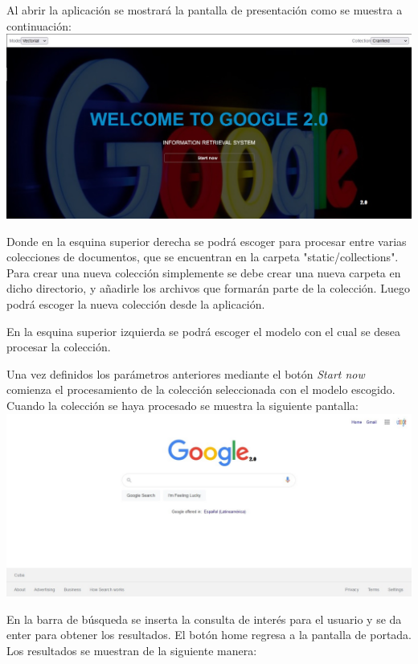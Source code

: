 \documentclass[twoside]{article}
\begin{document}
Al abrir la aplicaci\'on se mostrar\'a la pantalla de presentaci\'on como se muestra a continuaci\'on:\\

\includegraphics[scale=0.4]{img/portada.jpg}

Donde en la esquina superior derecha se podr\'a escoger para procesar entre varias colecciones de documentos, que se encuentran en la carpeta "static/collections". Para crear una nueva colecci\'on simplemente se debe crear una nueva carpeta en dicho directorio, y a\~nadirle los archivos que formar\'an parte de la colecci\'on. Luego podr\'a escoger la nueva colecci\'on desde la aplicaci\'on.

En la esquina superior izquierda se podr\'a escoger el modelo con el cual se desea procesar la colecci\'on.

Una vez definidos los par\'ametros anteriores mediante el bot\'on \textit{Start now} comienza el procesamiento de la colecci\'on seleccionada con el modelo escogido. Cuando la colecci\'on se haya procesado se muestra la siguiente pantalla:\\

\includegraphics[scale=0.4]{img/barra_busqueda.jpg}

En la barra de b\'usqueda se inserta la consulta de inter\'es para el usuario y se da enter para obtener los resultados. El bot\'on home regresa a la pantalla de portada. Los resultados se muestran de la siguiente manera:\\
\end{document}
